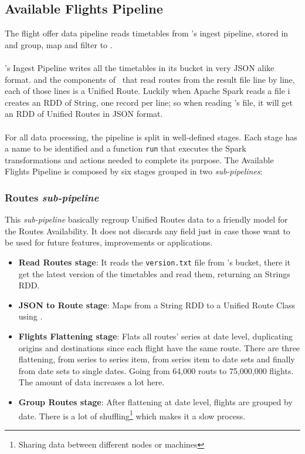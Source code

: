\subsection{Available Flights Pipeline} \label{available-flights-pipeline}

The flight offer data pipeline reads timetables from \squad's ingest pipeline, stored in  and group, map and filter to .
\\\\
\squad's Ingest Pipeline writes all the timetables in its  bucket in very JSON\cite{json} alike format.  and the components of \squad\ that read routes from the result file line by line, each of those lines is a Unified Route. Luckily when Apache Spark reads a file i creates an RDD of String, one record per line; so when reading \squad's file, it will get an RDD of Unified Routes in JSON\cite{json} format.
\\\\
For all data processing, the pipeline is split in well-defined stages. Each stage has a name to be identified and a function \texttt{run} that executes the Spark transformations and actions needed to complete its purpose. The Available Flights Pipeline is composed by six stages grouped in two \textit{sub-pipelines}:

\subsubsection*{Routes \textit{sub-pipeline}}

This \textit{sub-pipeline} basically regroup Unified Routes data to a friendly model for the Routes Availability. It does not discards any field just in case those want to be used for future features, improvements or applications.

\begin{itemize}
    \item \textbf{Read Routes stage}: It reads the \texttt{version.txt} file from \squad's bucket, there it get the latest version of the timetables and read them, returning an Strings RDD.
    \item \textbf{JSON to Route stage}: Maps from a String RDD to a Unified Route Class using .
    \item \textbf{Flights Flattening stage}: Flats all routes' series at date level, duplicating origins and destinations since each flight have the same route. There are three flattening, from series to series item, from series item to date sets and finally from date sets to single dates. Going from 64,000 routs to 75,000,000 flights. The amount of data increases a lot here.
    \item \textbf{Group Routes stage}: After flattening at date level, flights are grouped by date. There is a lot of shuffling\footnote{Sharing data between different nodes or machines} which makes it a slow process.
\end{itemize}

